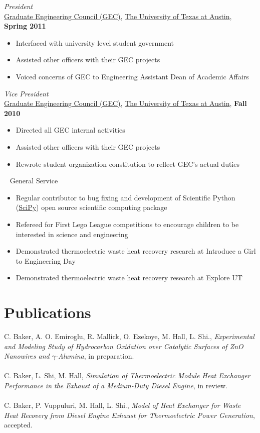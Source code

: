\documentclass[centered]{res}
\begin{document}
\begin{resume}
\textit{President} \\
\href{http://sites.google.com/site/utexasgecouncil/}{Graduate Engineering Council (GEC)},
\href{http://www.utexas.edu}{The University of Texas at Austin},
\hfill \textbf{Spring 2011}
\begin{itemize} \itemsep -2pt %
\item Interfaced with university level student government
\item Assisted other officers with their GEC projects
\item Voiced concerns of GEC to Engineering Assistant Dean of Academic
  Affairs 
\end{itemize}
\newpage
\textit{Vice President} \\
\href{http://sites.google.com/site/utexasgecouncil/}{Graduate Engineering Council (GEC)},
\href{http://www.utexas.edu}{The University of Texas at Austin},
  \hfill \textbf{Fall 2010}
  \begin{itemize} \itemsep -2pt %
  \item Directed all GEC internal activities
  \item Assisted other officers with their GEC projects
  \item Rewrote student organization constitution to reflect GEC's actual duties
  \end{itemize}~
%
General Service
\begin{itemize} \itemsep -2pt %
\item Regular contributor to bug fixing and development of Scientific
  Python (\href{http://www.scipy.org/}{SciPy}) open source scientific
  computing package
\item Refereed for First Lego League competitions to encourage
  children to be interested in science and engineering
\item Demonstrated thermoelectric waste heat recovery research at
  Introduce a Girl to Engineering Day
\item Demonstrated thermoelectric waste heat recovery research at
  Explore UT 
\end{itemize}

\section{Publications}
C. Baker, A. O. Emiroglu, R. Mallick, O. Ezekoye, M. Hall, L. Shi.,
\textit{Experimental and Modeling Study of Hydrocarbon Oxidation over
  Catalytic Surfaces of ZnO Nanowires and $\gamma$-Alumina}, in
preparation. \\
\vspace{-5pt} \\
%
C. Baker, L. Shi, M. Hall, \textit{Simulation of Thermoelectric
  Module Heat Exchanger Performance in the Exhaust of a Medium-Duty
  Diesel Engine}, in review.  \\
\vspace{-5pt} \\
%
C. Baker, P. Vuppuluri, M. Hall, L. Shi., \textit{Model of Heat
  Exchanger for Waste Heat Recovery from Diesel Engine Exhaust for
  Thermoelectric Power Generation}, accepted.  


\end{resume}
\end{document}
